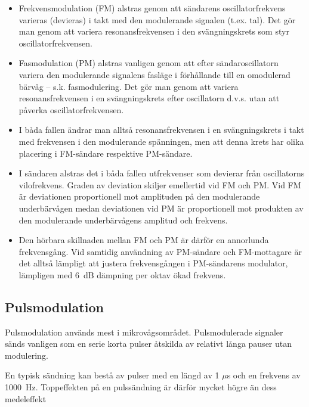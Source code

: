 \begin{itemize}
\item Frekvensmodulation (FM) alstras genom att sändarens oscillatorfrekvens
  varieras (devieras) i takt med den modulerande signalen (t.ex. tal).
  Det gör man genom att variera resonansfrekvensen i den svängningskrets som
  styr oscillatorfrekvensen.

\item Fasmodulation (PM) alstras vanligen genom att efter sändaroscillatorn
  variera den modulerande signalens fasläge i förhållande till en omodulerad
  bärvåg -- s.k. fasmodulering.
  Det gör man genom att variera resonansfrekvensen i en svängningskrets efter
  oscillatorn d.v.s. utan att påverka oscillatorfrekvensen.

\item I båda fallen ändrar man alltså resonansfrekvensen i en svängningskrets i
  takt med frekvensen i den modulerande spänningen, men att denna krets har
  olika placering i FM-sändare respektive PM-sändare.

\item I sändaren alstras det i båda fallen utfrekvenser som devierar från
  oscillatorns vilofrekvens.
  Graden av deviation skiljer emellertid vid FM och PM.
  Vid FM är deviationen proportionell mot amplituden på den modulerande
  underbärvågen medan deviationen vid PM är proportionell mot produkten av den
  modulerande underbärvågens amplitud och frekvens.

\item Den hörbara skillnaden mellan FM och PM är därför en annorlunda
  frekvensgång.
  Vid samtidig användning av PM-sändare och FM-mottagare är det alltså lämpligt
  att justera frekvensgången i PM-sändarens modulator, lämpligen
  med 6~dB dämpning per oktav ökad frekvens.
\end{itemize}

\subsection{Pulsmodulation}

Pulsmodulation används mest i mikrovågsområdet.
Pulsmodulerade signaler sänds vanligen som en serie korta pulser åtskilda av
relativt långa pauser utan modulering.

En typisk sändning kan bestå av pulser med en längd av 1 \(\mu\)s och en
frekvens av 1000~Hz.
Toppeffekten på en pulssändning är därför mycket högre än dess medeleffekt

